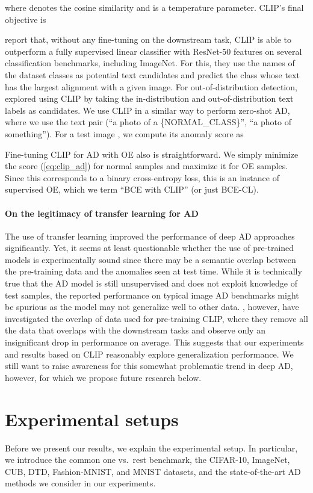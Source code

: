 \documentclass[10pt]{article} \usepackage[accepted]{stylefiles/tmlr}
\begin{document}
where  denotes the cosine similarity and  is a temperature parameter. 
CLIP's final objective is


\citet{radford2021learning} report that, without any fine-tuning on the downstream task, CLIP is able to outperform a fully supervised linear classifier with ResNet-50 features on several classification benchmarks, including ImageNet. 
For this, they use the names of the dataset classes as potential text candidates and predict the class whose text has the largest alignment with a given image. 
For out-of-distribution detection, \citet{fort2021exploring} explored using CLIP by taking the in-distribution and out-of-distribution text labels as candidates.
We use CLIP in a similar way to perform zero-shot AD, where we use the text pair  (``a photo of a \{NORMAL\_CLASS\}'', ``a photo of something'').
For a test image , we compute its anomaly score as

Fine-tuning CLIP for AD with OE also is straightforward.
We simply minimize the score (\ref{eq:clip_ad}) for normal samples and maximize it for OE samples.
Since this corresponds to a binary cross-entropy loss, this is an instance of supervised OE, which we term ``BCE with CLIP'' (or just BCE-CL). 

\paragraph{On the legitimacy of transfer learning for AD} 
The use of transfer learning improved the performance of deep AD approaches significantly.
Yet, it seems at least questionable whether the use of pre-trained models is experimentally sound since there may be a semantic overlap between the pre-training data and the anomalies seen at test time. 
While it is technically true that the AD model is still unsupervised and does not exploit knowledge of test samples, the reported performance on typical image AD benchmarks might be spurious as the model may not generalize well to other data.
\citet{radford2021learning}, however, have investigated the overlap of data used for pre-training CLIP, where they remove all the data that overlaps with the downstream tasks and observe only an insignificant drop in performance on average. 
This suggests that our experiments and results based on CLIP reasonably explore generalization performance.
We still want to raise awareness for this somewhat problematic trend in deep AD, however, for which we propose future research below.


\section{Experimental setups}
\label{sec:experimental_setups}
Before we present our results, we explain the experimental setup. 
In particular, we introduce the common one vs.~rest benchmark, the CIFAR-10, ImageNet, CUB, DTD, Fashion-MNIST, and MNIST datasets, and the state-of-the-art AD methods we consider in our experiments.
\end{document}
